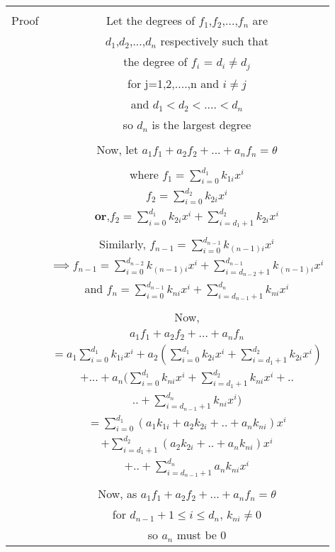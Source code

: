 \documentclass[journal,12pt,twocolumn]{IEEEtran}
\begin{document}
\begin{table}[h!]
\begin{center}
\begin{tabular}{|c|c|}
\hline
& \\
Proof & Let the degrees of $f_1$,$f_2$,...,$f_n$ are\\
& $d_1$,$d_2$,...,$d_n$ respectively such that\\
& the degree of $f_i$ = $d_i \neq d_j$\\
& for j=1,2,....,n and $i \neq j$\\
& and $d_1 < d_2 < ....< d_n$\\
& so $d_n$ is the largest degree\\
& \\
& Now, let $a_1f_1+a_2f_2+...+a_nf_n=\theta$\\
& \\
& where $f_1 = \sum_{i=0}^{d_1}k_{1i}x^i$\\
& $f_2 = \sum_{i=0}^{d_2}k_{2i}x^i$\\
& $\textbf{or,}f_2 = \sum_{i=0}^{d_1}k_{2i}x^i+ \sum_{i=d_1+1}^{d_2}k_{2i}x^i$\\
& \\
& Similarly, $f_{n-1}=\sum_{i=0}^{d_{n-1}}k_{(n-1)i}x^i$\\
& $\implies f_{n-1}= \sum_{i=0}^{d_{n-2}}k_{(n-1)i}x^i+ \sum_{i=d_{n-2}+1}^{d_{n-1}}k_{(n-1)i}x^i$\\
& and $f_n = \sum_{i=0}^{d_{n-1}}k_{ni}x^i+ \sum_{i=d_{n-1}+1}^{d_{n}}k_{ni}x^i$\\
& \\
& Now,\\
& $a_1f_1+a_2f_2+...+a_nf_n$\\
& $=a_1\sum_{i=0}^{d_1}k_{1i}x^i + a_2(\sum_{i=0}^{d_1}k_{2i}x^i+ \sum_{i=d_1+1}^{d_2}k_{2i}x^i)$\\
& $+ ...+a_n(\sum_{i=0}^{d_1}k_{ni}x^i+ \sum_{i=d_1+1}^{d_2}k_{ni}x^i+..$\\
& $..+\sum_{i=d_{n-1}+1}^{d_{n}}k_{ni}x^i)$\\
& $=\sum_{i=0}^{d_1}(a_1k_{1i}+a_2k_{2i}+..+a_nk_{ni})x^i$\\
& $+\sum_{i=d_1+1}^{d_2}(a_2k_{2i}+..+a_nk_{ni})x^i$\\
& $+..+\sum_{i=d_{n-1}+1}^{d_{n}}a_nk_{ni}x^i$\\
& \\
& Now, as $a_1f_1+a_2f_2+...+a_nf_n=\theta$ \\
& for $d_{n-1}+1\leq i \leq d_n$, $k_{ni}\neq 0$\\
& so $a_n$ must be 0\\

\end{tabular}
\end{center}
\end{table}
\end{document}
